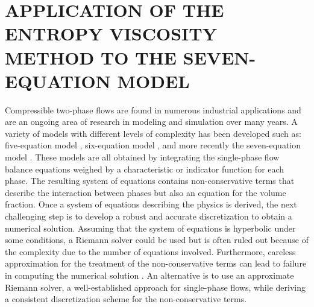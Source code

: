 %
%
%


\chapter{\uppercase {Application of the entropy viscosity method to the seven-equation model}}\label{chap:seven}
%
Compressible two-phase flows are found in numerous industrial applications and are an ongoing area of research in modeling and simulation over many years. A variety of models with different levels of complexity has been developed such as: five-equation model \cite{Kapila_2001}, six-equation model \cite{Toumi_1996}, and more recently the seven-equation model \cite{SEM}. These models are all obtained by integrating the single-phase flow balance equations weighed by a characteristic or indicator function for each phase. The resulting system of equations contains non-conservative terms that describe the interaction between phases but also an equation for the volume fraction. Once a system of equations describing the physics is derived, the next challenging step is to develop a robust and accurate discretization to obtain a numerical solution. Assuming that the system of equations is hyperbolic under some conditions, a Riemann solver could be used but is often ruled out because of the complexity due to the number of equations involved. Furthermore, careless approximation for the treatment of the non-conservative terms can lead to failure in computing the numerical solution \cite{Abgrall_2002}. An alternative is to use an approximate Riemann solver, a well-established approach for single-phase flows, while deriving a consistent discretization scheme for the non-conservative terms. 

